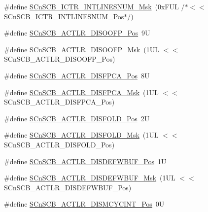 \begin{DoxyCompactItemize}
\item 
\#define \hyperlink{group___c_m_s_i_s___s_cn_s_c_b_ga3efa0f5210051464e1034b19fc7b33c7}{S\-Cn\-S\-C\-B\-\_\-\-I\-C\-T\-R\-\_\-\-I\-N\-T\-L\-I\-N\-E\-S\-N\-U\-M\-\_\-\-Msk}~(0x\-F\-U\-L /$\ast$$<$$<$ S\-Cn\-S\-C\-B\-\_\-\-I\-C\-T\-R\-\_\-\-I\-N\-T\-L\-I\-N\-E\-S\-N\-U\-M\-\_\-\-Pos$\ast$/)
\item 
\#define \hyperlink{group___c_m_s_i_s___s_cn_s_c_b_gaff0b57464c60fea8182b903676f8de49}{S\-Cn\-S\-C\-B\-\_\-\-A\-C\-T\-L\-R\-\_\-\-D\-I\-S\-O\-O\-F\-P\-\_\-\-Pos}~9\-U
\item 
\#define \hyperlink{group___c_m_s_i_s___s_cn_s_c_b_ga1ecd6adafa43464d7097b132c19e8640}{S\-Cn\-S\-C\-B\-\_\-\-A\-C\-T\-L\-R\-\_\-\-D\-I\-S\-O\-O\-F\-P\-\_\-\-Msk}~(1\-U\-L $<$$<$ S\-Cn\-S\-C\-B\-\_\-\-A\-C\-T\-L\-R\-\_\-\-D\-I\-S\-O\-O\-F\-P\-\_\-\-Pos)
\item 
\#define \hyperlink{group___c_m_s_i_s___s_cn_s_c_b_gaa194809383bc72ecf3416d85709281d7}{S\-Cn\-S\-C\-B\-\_\-\-A\-C\-T\-L\-R\-\_\-\-D\-I\-S\-F\-P\-C\-A\-\_\-\-Pos}~8\-U
\item 
\#define \hyperlink{group___c_m_s_i_s___s_cn_s_c_b_ga10d5aa4a196dcde6f476016ece2c1b69}{S\-Cn\-S\-C\-B\-\_\-\-A\-C\-T\-L\-R\-\_\-\-D\-I\-S\-F\-P\-C\-A\-\_\-\-Msk}~(1\-U\-L $<$$<$ S\-Cn\-S\-C\-B\-\_\-\-A\-C\-T\-L\-R\-\_\-\-D\-I\-S\-F\-P\-C\-A\-\_\-\-Pos)
\item 
\#define \hyperlink{group___c_m_s_i_s___s_cn_s_c_b_gaab395870643a0bee78906bb15ca5bd02}{S\-Cn\-S\-C\-B\-\_\-\-A\-C\-T\-L\-R\-\_\-\-D\-I\-S\-F\-O\-L\-D\-\_\-\-Pos}~2\-U
\item 
\#define \hyperlink{group___c_m_s_i_s___s_cn_s_c_b_gaa9dd2d4a2350499188f438d0aa9fd982}{S\-Cn\-S\-C\-B\-\_\-\-A\-C\-T\-L\-R\-\_\-\-D\-I\-S\-F\-O\-L\-D\-\_\-\-Msk}~(1\-U\-L $<$$<$ S\-Cn\-S\-C\-B\-\_\-\-A\-C\-T\-L\-R\-\_\-\-D\-I\-S\-F\-O\-L\-D\-\_\-\-Pos)
\item 
\#define \hyperlink{group___c_m_s_i_s___s_cn_s_c_b_gafa2eb37493c0f8dae77cde81ecf80f77}{S\-Cn\-S\-C\-B\-\_\-\-A\-C\-T\-L\-R\-\_\-\-D\-I\-S\-D\-E\-F\-W\-B\-U\-F\-\_\-\-Pos}~1\-U
\item 
\#define \hyperlink{group___c_m_s_i_s___s_cn_s_c_b_ga6cda7b7219232a008ec52cc8e89d5d08}{S\-Cn\-S\-C\-B\-\_\-\-A\-C\-T\-L\-R\-\_\-\-D\-I\-S\-D\-E\-F\-W\-B\-U\-F\-\_\-\-Msk}~(1\-U\-L $<$$<$ S\-Cn\-S\-C\-B\-\_\-\-A\-C\-T\-L\-R\-\_\-\-D\-I\-S\-D\-E\-F\-W\-B\-U\-F\-\_\-\-Pos)
\item 
\#define \hyperlink{group___c_m_s_i_s___s_cn_s_c_b_gaaa3e79f5ead4a32c0ea742b2a9ffc0cd}{S\-Cn\-S\-C\-B\-\_\-\-A\-C\-T\-L\-R\-\_\-\-D\-I\-S\-M\-C\-Y\-C\-I\-N\-T\-\_\-\-Pos}~0\-U

\end{DoxyCompactItemize}
